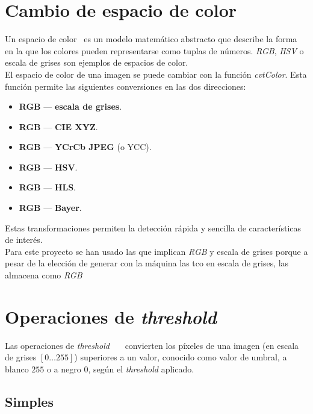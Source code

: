 \section{Cambio de espacio de color}\label{tecnica:cambio-color}
Un espacio de color~\emph{\citep*[Changing
  Colorspaces]{opencv_tutorial-bib}} es un modelo matemático abstracto
que describe la forma en la que los colores pueden representarse como
tuplas de
números. \emph{RGB}, \emph{HSV} o escala de grises son ejemplos de espacios de color. \\
El espacio de color de una imagen se puede cambiar con la función
\emph{cvtColor}. Esta función permite las siguientes conversiones en
las dos direcciones:
\begin{itemize}
\item \textbf{RGB} --- \textbf{escala de grises}.
\item \textbf{RGB} --- \textbf{CIE XYZ}.
\item \textbf{RGB} --- \textbf{YCrCb JPEG} (o YCC).
\item \textbf{RGB} --- \textbf{HSV}.
\item \textbf{RGB} --- \textbf{HLS}.
\item \textbf{RGB} --- \textbf{Bayer}.
\end{itemize}
Estas transformaciones permiten la detección rápida y sencilla de
características de interés. \\
Para este proyecto se han usado las que implican \emph{RGB} y escala
de grises porque a pesar de la elección de generar con la máquina las
\gls{tco} en escala de grises, las almacena como \emph{RGB}

\section{Operaciones de \emph{threshold}}
Las operaciones de \emph{threshold}~\emph{\citep*[Image
  Thresholding]{opencv_tutorial-bib}}~\emph{\citep*[Threshold]{opencv_book-bib}}~\emph{\citep*[6.5
  Thresholding]{toennies2012guide}} convierten los píxeles de una
imagen (en escala de grises $\left[0 \dots 255\right]$) superiores a
un valor, conocido como valor de umbral, a blanco $255$ o a negro $0$,
según el \emph{threshold} aplicado.
\subsection{Simples}
